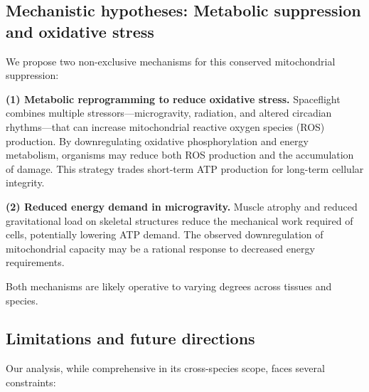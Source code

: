 \documentclass[11pt,a4paper]{article}
\begin{document}
\subsection{Mechanistic hypotheses: Metabolic suppression and oxidative stress}
\label{sec:discussion:mechanism}

We propose two non-exclusive mechanisms for this conserved mitochondrial suppression:

\textbf{(1) Metabolic reprogramming to reduce oxidative stress.} Spaceflight combines 
multiple stressors—microgravity, radiation, and altered circadian rhythms—that can 
increase mitochondrial reactive oxygen species (ROS) production. By downregulating 
oxidative phosphorylation and energy metabolism, organisms may reduce both ROS production 
and the accumulation of damage. This strategy trades short-term ATP production for 
long-term cellular integrity.

\textbf{(2) Reduced energy demand in microgravity.} Muscle atrophy and reduced gravitational 
load on skeletal structures reduce the mechanical work required of cells, potentially 
lowering ATP demand. The observed downregulation of mitochondrial capacity may be a 
rational response to decreased energy requirements.

Both mechanisms are likely operative to varying degrees across tissues and species.

\subsection{Limitations and future directions}
\label{sec:discussion:limitations}

Our analysis, while comprehensive in its cross-species scope, faces several constraints:
\end{document}

